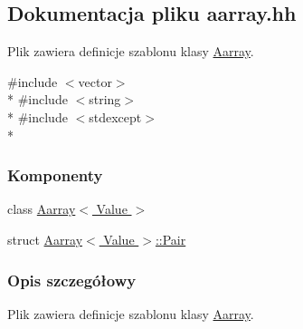 \hypertarget{aarray_8hh}{\subsection{Dokumentacja pliku aarray.\-hh}
\label{aarray_8hh}
}


Plik zawiera definicje szablonu klasy \hyperlink{class_aarray}{Aarray}.  


{\ttfamily \#include $<$vector$>$}\\*
{\ttfamily \#include $<$string$>$}\\*
{\ttfamily \#include $<$stdexcept$>$}\\*
\subsubsection*{Komponenty}
\begin{DoxyCompactItemize}
\item 
class \hyperlink{class_aarray}{Aarray$<$ Value $>$}
\item 
struct \hyperlink{struct_aarray_1_1_pair}{Aarray$<$ Value $>$\-::\-Pair}
\end{DoxyCompactItemize}


\subsubsection{Opis szczegółowy}
Plik zawiera definicje szablonu klasy \hyperlink{class_aarray}{Aarray}. 